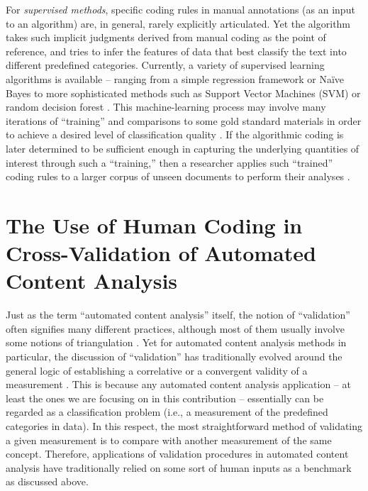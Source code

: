 \documentclass[man, floatsintext, 12pt, a4paper, noextraspace]{apa6}
\begin{document}
    For \textit{supervised methods}, specific coding rules in manual annotations (as an input to an algorithm) are, in general, rarely explicitly articulated. Yet the algorithm takes such implicit judgments derived from manual coding as the point of reference, and tries to infer the features of data that best classify the text into different predefined categories. Currently, a variety of supervised learning algorithms is available -- ranging from a simple regression framework or Naïve Bayes to more sophisticated methods such as Support Vector Machines (SVM) or random decision forest \parencites[for an overview, see][]{hindman2015building}. This machine-learning process may involve many iterations of \enquote{training} and comparisons to some gold standard materials in order to achieve a desired level of classification quality \parencites[e.g.,][]{scharkow2013thematic}. If the algorithmic coding is later determined to be sufficient enough in capturing the underlying quantities of interest through such a \enquote{training,} then a researcher applies such \enquote{trained} coding rules to a larger corpus of unseen documents to perform their analyses \parencites[e.g.,][]{burscher2015using, burscher2014teaching, scharkow2013thematic, gonzalez2015signals}.    
    
 \section{The Use of Human Coding in Cross-Validation of Automated Content Analysis}
    
    Just as the term \enquote{automated content analysis} itself, the notion of \enquote{validation} often signifies many different practices, although most of them usually involve some notions of triangulation \parencites[e.g.,][]{Neunhoeffer2018}. Yet for automated content analysis methods in particular, the discussion of \enquote{validation} has traditionally evolved around the general logic of establishing a correlative or a convergent validity of a measurement \parencites[][]{Krippendorff2008validity}. This is because any automated content analysis application -- at least the ones we are focusing on in this contribution -- essentially can be regarded as a classification problem (i.e., a measurement of the predefined categories in data). In this respect, the most straightforward method of validating a given measurement is to compare with another measurement of the same concept. Therefore, applications of validation procedures in automated content analysis have traditionally relied on some sort of human inputs as a benchmark as discussed above. 
    
\end{document}
